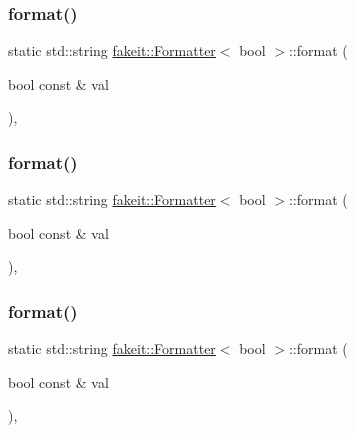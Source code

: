 \subsubsection{\texorpdfstring{format()}{format()}\hspace{0.1cm}{\footnotesize\ttfamily [1/9]}}
{\footnotesize\ttfamily static std\+::string \mbox{\hyperlink{structfakeit_1_1Formatter}{fakeit\+::\+Formatter}}$<$ bool $>$\+::format (\begin{DoxyParamCaption}\item[{bool const \&}]{val }\end{DoxyParamCaption})\hspace{0.3cm}{\ttfamily [inline]}, {\ttfamily [static]}}

\mbox{\label{structfakeit_1_1Formatter_3_01bool_01_4_ade95cb15541529f9760a2916edf0887a}} 
\subsubsection{\texorpdfstring{format()}{format()}\hspace{0.1cm}{\footnotesize\ttfamily [2/9]}}
{\footnotesize\ttfamily static std\+::string \mbox{\hyperlink{structfakeit_1_1Formatter}{fakeit\+::\+Formatter}}$<$ bool $>$\+::format (\begin{DoxyParamCaption}\item[{bool const \&}]{val }\end{DoxyParamCaption})\hspace{0.3cm}{\ttfamily [inline]}, {\ttfamily [static]}}

\mbox{\label{structfakeit_1_1Formatter_3_01bool_01_4_ade95cb15541529f9760a2916edf0887a}} 
\subsubsection{\texorpdfstring{format()}{format()}\hspace{0.1cm}{\footnotesize\ttfamily [3/9]}}
{\footnotesize\ttfamily static std\+::string \mbox{\hyperlink{structfakeit_1_1Formatter}{fakeit\+::\+Formatter}}$<$ bool $>$\+::format (\begin{DoxyParamCaption}\item[{bool const \&}]{val }\end{DoxyParamCaption})\hspace{0.3cm}{\ttfamily [inline]}, {\ttfamily [static]}}

